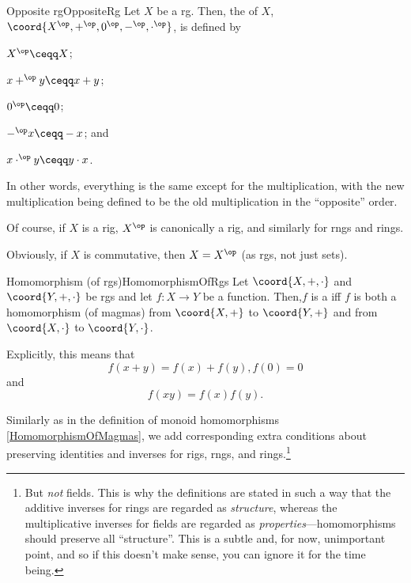 \begin{dfn}{Opposite rg}{OppositeRg}
	Let $X$ be a rg.  Then, the  of $X$, $\coord{X^{\op},+^{\op},0^{\op},-^{\op},\cdot ^{\op}}$, is defined by
	\begin{data}
		\item $X^{\op}\ceqq X$;
		\item $x+^{\op}y\ceqq x+y$;
		\item $0^{\op}\ceqq 0$;
		\item $-^{\op}x\ceqq -x$; and
		\item $x\cdot ^{\op}y\ceqq y\cdot x$.
	\end{data}
	\begin{rmk}
		In other words, everything is the same except for the multiplication, with the new multiplication being defined to be the old multiplication in the ``opposite'' order.
	\end{rmk}
	\begin{rmk}
		Of course, if $X$ is a rig, $X^{\op}$ is canonically a rig, and similarly for rngs and rings.
	\end{rmk}
	\begin{rmk}
		Obviously, if $X$ is commutative, then $X=X^{\op}$ (as rgs, not just sets).
	\end{rmk}
\end{dfn}
\begin{dfn}{Homomorphism (of rgs)}{HomomorphismOfRgs}
Let $\coord{X,+,\cdot}$ and $\coord{Y,+,\cdot}$ be rgs and let $f\colon X\rightarrow Y$ be a function.  Then,$f$ is a  iff $f$ is both a homomorphism (of magmas) from $\coord{X,+}$ to $\coord{Y,+}$ and from $\coord{X,\cdot}$ to $\coord{Y,\cdot}$.
\begin{rmk}
Explicitly, this means that
\begin{equation}
f(x+y)=f(x)+f(y),f(0)=0
\end{equation}
and
\begin{equation}
f(xy)=f(x)f(y).
\end{equation}
\end{rmk}
\begin{rmk}
Similarly as in the definition of monoid homomorphisms \cref{HomomorphismOfMagmas}, we add corresponding extra conditions about preserving identities and inverses for rigs, rngs, and rings.\footnote{But \emph{not} fields.  This is why the definitions are stated in such a way that the additive inverses for rings are regarded as \emph{structure}, whereas the multiplicative inverses for fields are regarded as \emph{properties}---homomorphisms should preserve all ``structure''.  This is a subtle and, for now, unimportant point, and so if this doesn't make sense, you can ignore it for the time being.}
\end{rmk}
\end{dfn}

